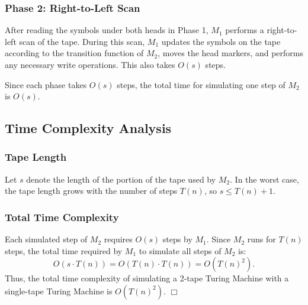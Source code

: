 \documentclass[a4paper]{article}
\begin{document}
\subsubsection{Phase 2: Right-to-Left Scan}
After reading the symbols under both heads in Phase 1, \( M_1 \) performs a right-to-left scan of the tape. During this scan, \( M_1 \) updates the symbols on the tape according to the transition function of \( M_2 \), moves the head markers, and performs any necessary write operations. This also takes \( O(s) \) steps.

Since each phase takes \( O(s) \) steps, the total time for simulating one step of \( M_2 \) is \( O(s) \).

\subsection{Time Complexity Analysis}

\subsubsection{Tape Length}
Let \( s \) denote the length of the portion of the tape used by \( M_2 \). In the worst case, the tape length grows with the number of steps \( T(n) \), so \( s \leq T(n) + 1 \).

\subsubsection{Total Time Complexity}
Each simulated step of \( M_2 \) requires \( O(s) \) steps by \( M_1 \). Since \( M_2 \) runs for \( T(n) \) steps, the total time required by \( M_1 \) to simulate all steps of \( M_2 \) is:
\[
O(s \cdot T(n)) = O(T(n) \cdot T(n)) = O(T(n)^2).
\]
Thus, the total time complexity of simulating a 2-tape Turing Machine with a single-tape Turing Machine is \( O(T(n)^2) \).  \hfill $\Box$

\end{document}
